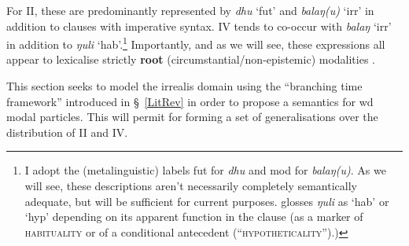 For \gls{II}, these are predominantly represented by \textit{dhu} `\gls{fut}' and \textit{balaŋ(u)} `\gls{irr}' in addition to clauses with imperative syntax. \gls{IV} tends to co-occur with \textit{balaŋ} `\gls{irr}' in addition to \textit{ŋuli} `\gls{hab}'.\footnote{I adopt the (metalinguistic) labels \gls{fut} for \textit{dhu} \citep[following][]{Wilkinson1991} and \gls{mod} for \textit{balaŋ(u)}. As we will see, these descriptions aren't necessarily completely semantically adequate, but will be sufficient for current purposes. \citet{Wilkinson1991} glosses \textit{ŋuli} as `\gls{hab}' or `\gls{hyp}' depending on its apparent function in the clause (as a marker of \textsc{habituality} or of a conditional antecedent (``\textsc{hypotheticality}'').)\label{irr-glossing}} Importantly, and as we will see, these expressions all appear to lexicalise strictly \textbf{root} (circumstantial\slash{}non-epistemic) modalities \citep[\textit{contra claims in}][123]{VanderWal1992}.

This section seeks to model the irrealis domain using the ``branching time framework'' introduced in \S~\ref{LitRev} in order to propose a semantics for \gls{wd} modal particles. This will permit for forming a set of generalisations over the distribution of \gls{II} and \gls{IV}.



